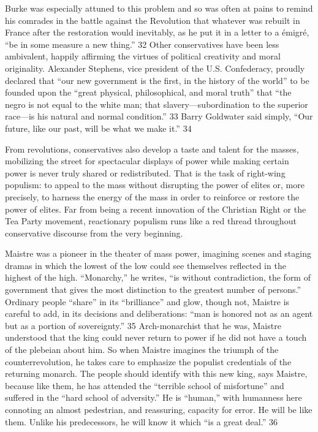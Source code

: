  \par 
Burke was especially attuned to this problem and so was often at pains to remind his comrades in the battle against the Revolution that whatever was rebuilt in France after the restoration would inevitably, as he put it in a letter to a émigré, “be in some measure a new thing.” 32 Other conservatives have been less ambivalent, happily affirming the virtues of political creativity and moral originality. Alexander Stephens, vice president of the U.S. Confederacy, proudly declared that “our new government is the first, in the history of the world” to be founded upon the “great physical, philosophical, and moral truth” that “the negro is not equal to the white man; that slavery—subordination to the superior race—is his natural and normal condition.” 33 Barry Goldwater said simply, “Our future, like our past, will be what we make it.” 34
 \par 
From revolutions, conservatives also develop a taste and talent for the masses, mobilizing the street for spectacular displays of power while making certain power is never truly shared or redistributed. That is the task of right-wing populism: to appeal to the mass without disrupting the power of elites or, more precisely, to harness the energy of the mass in order to reinforce or restore the power of elites. Far from being a recent innovation of the Christian Right or the Tea Party movement, reactionary populism runs like a red thread throughout conservative discourse from the very beginning.
 \par 
Maistre was a pioneer in the theater of mass power, imagining scenes and staging dramas in which the lowest of the low could see themselves reflected in the highest of the high. “Monarchy,” he writes, “is without contradiction, the form of government that gives the most distinction to the greatest number of persons.” Ordinary people “share” in its “brilliance” and glow, though not, Maistre is careful to add, in its decisions and deliberations: “man is honored not as an agent but as a portion of sovereignty.” 35 Arch-monarchist that he was, Maistre understood that the king could never return to power if he did not have a touch of the plebeian about him. So when Maistre imagines the triumph of the counterrevolution, he takes care to emphasize the populist credentials of the returning monarch. The people should identify with this new king, says Maistre, because like them, he has attended the “terrible school of misfortune” and suffered in the “hard school of adversity.” He is “human,” with humanness here connoting an almost pedestrian, and reassuring, capacity for error. He will be like them. Unlike his predecessors, he will know it which “is a great deal.” 36
